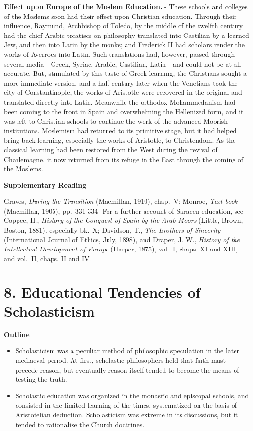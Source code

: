 \documentclass[
]{book}
\providecommand{\tightlist}{%
  \setlength{\itemsep}{0pt}\setlength{\parskip}{0pt}}
\begin{document}
\textbf{Effect upon Europe of the Moslem Education.} - These schools and colleges of the Moslems soon had their effect upon Christian education. Through their influence, Raymund, Archbishop of Toledo, by the middle of the twelfth century had the chief Arabic treatises on philosophy translated into Castilian by a learned Jew, and then into Latin by the monks; and Frederick II had scholars render the works of Averroes into Latin. Such translations had, however, passed through several media - Greek, Syriac, Arabic, Castilian, Latin - and could not be at all accurate. But, stimulated by this taste of Greek learning, the Christians sought a more immediate version, and a half century later when the Venetians took the city of Constantinople, the works of Aristotle were recovered in the original and translated directly into Latin. Meanwhile the orthodox Mohammedanism had been coming to the front in Spain and overwhelming the Hellenized form, and it was left to Christian schools to continue the work of the advanced Moorish institutions. Moslemism had returned to its primitive stage, but it had helped bring back learning, especially the works of Aristotle, to Christendom. As the classical learning had been restored from the West during the revival of Charlemagne, it now returned from its refuge in the East through the coming of the Moslems.

\textbf{Supplementary Reading}

Graves, \emph{During the Transition} (Macmillan, 1910), chap.~V; Monroe, \emph{Text-book} (Macmillan, 1905), pp.~331-334- For a further account of Saracen education, see Coppee, H., \emph{History of the Conquest of Spain by the Arab-Moors} (Little, Brown, Boston, 1881), especially bk.~X; Davidson, T., \emph{The Brothers of Sincerity} (International Journal of Ethics, July, 1898), and Draper, J. W., \emph{History of the Intellectual Development of Europe} (Harper, 1875), vol.~I, chaps. XI and XIII, and vol.~II, chaps. II and IV.

\hypertarget{educational-tendencies-of-scholasticism}{%
\chapter{8. Educational Tendencies of Scholasticism}\label{educational-tendencies-of-scholasticism}}

\textbf{Outline}

\begin{itemize}
\tightlist
\item
  Scholasticism was a peculiar method of philosophic speculation in the later mediaeval period. At first, scholastic philosophers held that faith must precede reason, but eventually reason itself tended to become the means of testing the truth.
\item
  Scholastic education was organized in the monastic and episcopal schools, and consisted in the limited learning of the times, systematized on the basis of Aristotelian deduction. Scholasticism was extreme in its discussions, but it tended to rationalize the Church doctrines.
\end{itemize}
\end{document}
